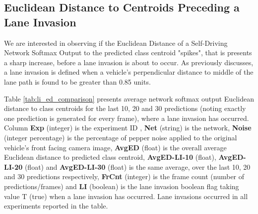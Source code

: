 

\subsection{Euclidean Distance to Centroids Preceding a Lane Invasion}
\label{res:ed_centroids_preceding_lane_invasion}

We are interested in observing if the Euclidean Distance of a Self-Driving Network Softmax Output to the predicted class centroid "spikes", that is presents a sharp increase, before a lane invasion is about to occur. As previously discusses, a lane invasion is defined when a vehicle's perpendicular distance to middle of the lane path is found to be greater than 0.85 units. 

Table \ref{tab:li_ed_comparison} presents average network softmax output Euclidean distance to class centroids for the last 10, 20 and 30 predictions (noting exactly one prediction is generated for every frame), where a lane invasion has occurred. Column \textbf{Exp} (integer) is the experiment ID , \textbf{Net} (string) is the network, \textbf{Noise} (integer percentage) is the percentage of pepper noise applied to the original vehicle's front facing camera image, \textbf{AvgED} (float) is the overall average Euclidean distance to predicted class centroid, \textbf{AvgED-LI-10} (float), \textbf{AvgED-LI-20} (float)  and \textbf{AvgED-LI-30} (float) is the same average, over the last 10, 20 and 30 predictions respectively, \textbf{FrCnt} (integer) is the frame count (number of predictions/frames) and \textbf{LI} (boolean) is the lane invasion boolean flag taking value T (true) when a lane invasion has occurred. Lane invasions occurred in all experiments reported in the table.

